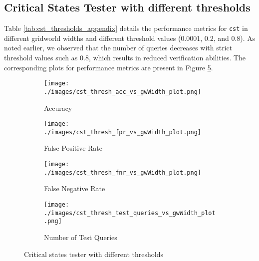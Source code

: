 \subsection{Critical States Tester with different thresholds}
Table \ref{tab:cst_thresholds_appendix} details the performance metrics for \texttt{cst} in different gridworld widths and different threshold values (0.0001, 0.2, and 0.8). As noted earlier, we observed that the number of queries decreases with strict threshold values such as 0.8, which results in reduced verification abilities. The corresponding plots for performance metrics are present in Figure \ref{fig:cst_threshold_experiments}.

\begin{figure}[!ht]
     \centering
     \begin{subfigure}[!ht]{0.4\textwidth}
         \centering
         \texttt{[image: ./images/cst\_thresh\_acc\_vs\_gwWidth\_plot.png]}
         \caption{Accuracy}
         \label{fig:cst_threshold_acc_vs_features_plot}
     \end{subfigure}
    \hspace{5mm}
     \begin{subfigure}[!ht]{0.4\textwidth}
         \centering
         \texttt{[image: ./images/cst\_thresh\_fpr\_vs\_gwWidth\_plot.png]}
         \caption{False Positive Rate}
         \label{fig:cst_threshold_fpr_vs_features_plot}
     \end{subfigure}
     \hspace{5mm}
     \begin{subfigure}[!ht]{0.4\textwidth}
         \centering
         \texttt{[image: ./images/cst\_thresh\_fnr\_vs\_gwWidth\_plot.png]}
         \caption{False Negative Rate}
         \label{fig:cst_threshold_fnr_vs_features_plot}
     \end{subfigure}
     \hspace{5mm}
    \begin{subfigure}[!ht]{0.4\textwidth}
         \centering
         \texttt{[image: ./images/cst\_thresh\_test\_queries\_vs\_gwWidth\_plot.png]}
         \caption{Number of Test Queries}
         \label{fig:cst_threshold_test_queries_vs_features_plot}
     \end{subfigure}
    \caption{Critical states tester with different thresholds}
    \label{fig:cst_threshold_experiments}
\end{figure}


